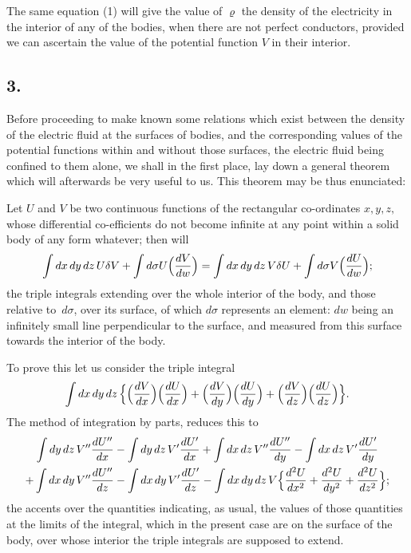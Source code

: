 \documentclass[11pt,notitlepage]{amsart}
\newcommand\Section[1]{\subsection{{#1}}}
\renewcommand{\rho}{\varrho}
\begin{document}
The same equation (1) will give the value of $\rho$ the density of the
electricity in the interior of any of the bodies, when there are not perfect
conductors, provided we can ascertain the value of the potential function $V$
in their interior.
\bigskip

\Section{3.}
Before proceeding to make known some relations which exist between
the density of the electric fluid at the surfaces of bodies, and the 
corresponding values of the potential functions
within and without those surfaces, the
electric fluid being confined to them alone, we shall in the first place, lay
down a general theorem which will afterwards be very useful to us. This
theorem may be thus enunciated:

Let $U$ and $V$ be two continuous functions of the rectangular co-ordinates
$x,y,z,$ whose differential co-efficients do not become infinite at any
point within a solid body of any form whatever; then will
\[
\int dx\,dy\,dz\,U\delta V
+\int d\sigma U\Bigl(\frac{dV}{dw}\Bigr)=
\int dx\,dy\,dz\,V\delta U
+\int d\sigma V\Bigl(\frac{dU}{dw}\Bigr);
\]
the triple integrals extending over the whole interior of the body, and those
relative to~$d\sigma$, over its surface,
of which $d\sigma$ represents an element: $dw$ being
an infinitely small line perpendicular to the surface, and measured from this
surface towards the interior of the body.

To prove this let us consider the triple integral
\[
\int dx\,dy\,dz\,
\Bigl\{
  \Bigl(\frac{dV}{dx}\Bigr)\Bigl(\frac{dU}{dx}\Bigr)
  +\Bigl(\frac{dV}{dy}\Bigr)\Bigl(\frac{dU}{dy}\Bigr)
  +\Bigl(\frac{dV}{dz}\Bigr)\Bigl(\frac{dU}{dz}\Bigr)
\Bigr\}.
\]
The method of integration by parts, reduces this to
\begin{multline*}
\int dy\,dz\,V''\frac{dU''}{dx}
-\int dy\,dz\,V'\frac{dU'}{dx}
+\int dx\,dz\,V''\frac{dU''}{dy}
-\int dx\,dz\,V'\frac{dU'}{dy}\\
+\int dx\,dy\,V''\frac{dU''}{dz}
-\int dx\,dy\,V'\frac{dU'}{dz}
-\int dx\,dy\,dz\,V
\Bigl\{\frac{d^2U}{dx^2}+\frac{d^2U}{dy^2}+\frac{d^2U}{dz^2}\Bigr\};
\end{multline*}
the accents over the quantities indicating, as usual, the values of those 
quantities at the limits of the integral,
which in the present case are on the surface
of the body, over whose interior the triple integrals are supposed to extend.
\end{document}
